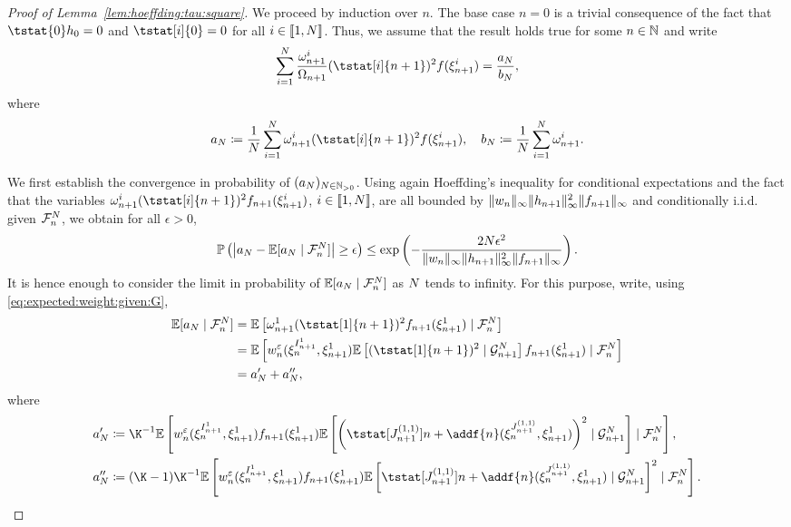 \begin{proof}[Proof of Lemma~\ref{lem:hoeffding:tau:square}]
We proceed by induction over $n$. The base case $n = 0$ is a trivial consequence of the fact that $\tstat{0} h_0 = 0$ and $\tstat[i]{0} = 0$ for all $i \in \llbracket 1, N \rrbracket$. Thus, we assume that the result holds true for some $n \in \mathbb{N}$ and write
\[
\sum_{i=1}^\N \frac{\ewght{n+1}{i}}{\sumwght{n+1}}(\tstat[i]{n+1})^2 f(\epart{n+1}{i}) = \frac{a_\N}{b_\N},
\]
where 
$$
a_\N \eqdef \frac{1}{\N}\sum_{i=1}^N\ewght{n+1}{i}(\tstat[i]{n+1})^2 f(\epart{n+1}{i}), \quad b_\N \eqdef \frac{1}{\N} \sum_{i=1}^N \ewght{n+1}{i}. 
$$

We first establish the convergence in probability of $(a_N)_{N \in \mathbb{N}_{> 0}}$. Using again Hoeffding's inequality for conditional expectations and the fact that the variables $\ewght{n+1}{i}(\tstat[i]{n + 1})^2 f_{n + 1}(\epart{n + 1}{i})$, $i \in \llbracket 1, N \rrbracket$, are all bounded by $\| w_{n} \|_\infty \| h_{n + 1} \|^2_\infty \| f_{n + 1}\|_\infty$ and conditionally i.i.d. given $\mathcal{F}_{n}^{N}$, we obtain for all $\epsilon > 0$,  
\[
\mathbb{P}\left(\left| a_N - \mathbb{E}[a_N \mid \mathcal{F}_{n}^{N}] \right| \geq \epsilon \right) \leq \exp \left( - \frac{2 N \epsilon^2}{\| w_{n} \|_\infty \| h_{n + 1} \|^2_\infty \| f_{n+1} \|_\infty} \right). 
\]
It is hence enough to consider the limit in probability of $\mathbb{E}[a_N \mid \mathcal{F}_{n}^{N}]$ as $N$ tends to infinity. For this purpose, write, using \eqref{eq:expected:weight:given:G}, 
\begin{align*}
\pE[a_\N \mid \calF{n}{\N}] &= \pE \left[ \ewght{n + 1}{1}(\tstat[1]{n + 1})^2 f_{n+1}(\epart{n + 1}{1}) \mid  \calF{n}{\N} \right] \\ 
&= \pE\left[\wgtfuncmod{n}(\epart{n}{\ind{n + 1}{1}}, \epart{n + 1}{1}) \pE \left[(\tstat[1]{n + 1})^2 \cond \calG{n + 1}{\N}\right] f_{n + 1}(\epart{n + 1}{1}) \cond \calF{n}{\N} \right] \\
&= a_\N' + a_\N'',
\end{align*}
where
\begin{align*}
a_\N' &\eqdef \K^{-1}\pE\left[ \wgtfuncmod{n}(\epart{n}{\ind{n + 1}{1}}, \epart{n + 1}{1}) f_{n + 1}(\epart{n + 1}{1}) \pE \left[ \left( \tstat[J_{n + 1}^{(1,1)}]{n} + \addf{n}(\epart{n}{J_{n + 1}^{(1,1)}}, \epart{n + 1}{1}) \right)^2 \cond \calG{n + 1}{\N}\right] \cond \calF{n}{\N} \right], \\
a_\N'' &\eqdef (\K - 1)\K^{-1} \pE \left[ \wgtfuncmod{n}(\epart{n}{\ind{n + 1}{1}}, \epart{n + 1}{1}) f_{n + 1}(\epart{n + 1}{1}) \pE \left[\tstat[J_{n + 1}^{(1,1)}]{n} + \addf{n}(\epart{n}{J_{n + 1}^{(1,1)}}, \epart{n + 1}{1}) \cond \calG{n + 1}{\N}\right]^2 \cond \calF{n}{\N} \right]. 

\end{align*}
\end{proof}
